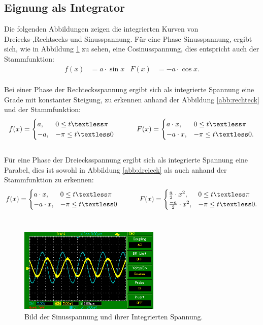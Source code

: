 \subsection{Eignung als Integrator}
Die folgenden Abbildungen zeigen die integrierten Kurven von Dreiecks-,Rechtsecks-und Sinusspannung.
Für eine Phase Sinusspannung, ergibt sich, wie in Abbildung \ref{abb:sinus} zu sehen, eine Cosinusspannung, dies entspricht auch der Stammfunktion:
\begin{align}
  f(x)&=a\cdot \sin{x}&F(x)&=-a\cdot \cos{x}.
\end{align}\\
Bei einer Phase der Rechtecksspannung ergibt sich als integrierte Spannung eine Grade mit konstanter Steigung,
zu erkennen anhand der Abbildung \ref{abb:rechteck} und der Stammfunktion:
\begin{align}
  f(x)=
  \begin{cases}
    a,& 0 \leq t \textless \pi\\
   -a,& -\pi \leq t \textless 0
  \end{cases}
  \ \ \ \ \ \ \ \ \
  F(x)=
  \begin{cases}
    a\cdot x,& 0 \leq t \textless \pi\\
   -a\cdot x,&  -\pi \leq t \textless 0.
  \end{cases}
\end{align}\\
Für eine Phase der Dreiecksspannung ergibt sich als integrierte Spannung eine Parabel, dies ist sowohl in Abbildung \ref{abb:dreieck} als auch anhand der Stammfunktion zu erkennen:
\begin{align}
  f(x)=
  \begin{cases}
    a\cdot x,& 0 \leq t \textless \pi\\
   -a\cdot x,&  -\pi \leq t \textless 0
  \end{cases}
  \ \ \ \ \ \ \ \ \
  F(x)=
  \begin{cases}
    \frac{a}{2}\cdot x^2,& 0 \leq t \textless \pi\\
   \frac{-a}{2}\cdot x^2,&  -\pi \leq t \textless 0.
  \end{cases}
\end{align}\\
\begin{figure}[h]
    \centering
    \includegraphics[width=0.6\textwidth]{MAP007.png}
    \caption{Bild der Sinusspannung und ihrer Integrierten Spannung.}
    \label{abb:sinus}
\end{figure}\\
